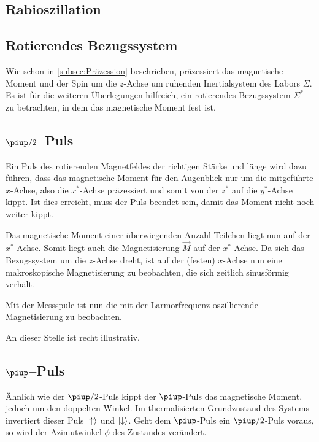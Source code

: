 \subsection{Rabioszillation}

\cite[Abschnitt~15.9.5 „Rabi-Atomstrahlresonanz”]{meschede-gerthsen_24}

\cite{wikipedia/Rabi_Oszillation}

\subsection{Rotierendes Bezugssystem}

Wie schon in \ref{subsec:Präzession} beschrieben, präzessiert das magnetische
Moment und der Spin um die $z$-Achse um ruhenden Inertialsystem des Labors
$\Sigma$. Es ist für die weiteren Überlegungen
hilfreich, ein rotierendes Bezugssystem $\Sigma^*$ zu betrachten, in dem das
magnetische Moment fest ist.

\subsection{$\piup/2$–Puls}

Ein Puls des rotierenden Magnetfeldes der richtigen Stärke und länge wird dazu
führen, dass das magnetische Moment für den Augenblick nur um die mitgeführte
$x$-Achse, also die $x^*$-Achse präzessiert und somit von der $z^*$ auf die
$y^*$-Achse kippt. Ist dies erreicht, muss der Puls beendet sein, damit das
Moment nicht noch weiter kippt.

Das magnetische Moment einer überwiegenden Anzahl Teilchen liegt nun auf der
$x^*$-Achse. Somit liegt auch die Magnetisierung $\vec M$ auf der $x^*$-Achse.
Da sich das Bezugssystem um die $z$-Achse dreht, ist auf der (festen) $x$-Achse
nun eine makroskopische Magnetisierung zu beobachten, die sich zeitlich
sinusförmig verhält.

Mit der Messspule ist nun die mit der Larmorfrequenz oszillierende
Magnetisierung zu beobachten.

An dieser Stelle ist \cite[Abbildung~15.55 auf Seite~765]{meschede-gerthsen_24}
recht illustrativ.

\subsection{$\piup$–Puls}

Ähnlich wie der $\piup/2$-Puls kippt der $\piup$-Puls das magnetische Moment,
jedoch um den doppelten Winkel. Im thermalisierten Grundzustand des Systems
invertiert dieser Puls $\ket\uparrow$ und $\ket\downarrow$. Geht dem
$\piup$-Puls ein $\piup/2$-Puls voraus, so wird der Azimutwinkel $\phi$ des
Zustandes verändert.

